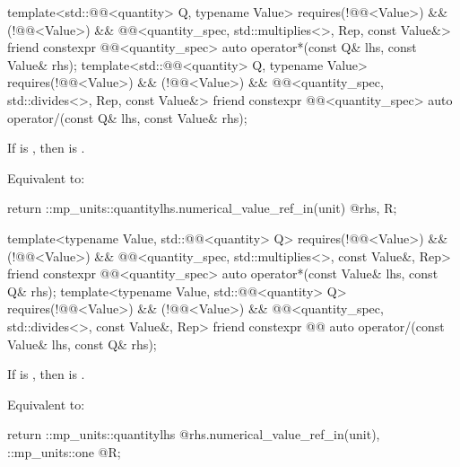 \begin{itemdecl}
template<std::@@<quantity> Q, typename Value>
  requires(!@@<Value>) && (!@@<Value>) &&
          @@<quantity_spec, std::multiplies<>, Rep, const Value&>
friend constexpr @@<quantity_spec> auto operator*(const Q& lhs, const Value& rhs);
template<std::@@<quantity> Q, typename Value>
  requires(!@@<Value>) && (!@@<Value>) &&
          @@<quantity_spec, std::divides<>, Rep, const Value&>
friend constexpr @@<quantity_spec> auto operator/(const Q& lhs, const Value& rhs);
\end{itemdecl}

\begin{itemdescr}
\pnum
\expects
If  is \tcode{/}, then  is .

\pnum
\effects
Equivalent to:
\begin{codeblock}
return ::mp_units::quantity{lhs.numerical_value_ref_in(unit) @\atsign@ rhs, R};
\end{codeblock}
\end{itemdescr}

\begin{itemdecl}
template<typename Value, std::@@<quantity> Q>
  requires(!@@<Value>) && (!@@<Value>) &&
          @@<quantity_spec, std::multiplies<>, const Value&, Rep>
friend constexpr @@<quantity_spec> auto operator*(const Value& lhs, const Q& rhs);
template<typename Value, std::@@<quantity> Q>
  requires(!@@<Value>) && (!@@<Value>) &&
          @@<quantity_spec, std::divides<>, const Value&, Rep>
friend constexpr @@ auto operator/(const Value& lhs, const Q& rhs);
\end{itemdecl}

\begin{itemdescr}
\pnum
\expects
If  is \tcode{/}, then  is .

\pnum
\effects
Equivalent to:
\begin{codeblock}
return ::mp_units::quantity{lhs @\atsign@ rhs.numerical_value_ref_in(unit), ::mp_units::one @\atsign@ R};
\end{codeblock}
\end{itemdescr}

